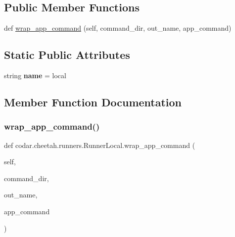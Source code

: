 \subsection*{Public Member Functions}
\begin{DoxyCompactItemize}
\item 
def \hyperlink{classcodar_1_1cheetah_1_1runners_1_1_runner_local_a188cd7fa3f8ebd97c936f2f00ee5b496}{wrap\+\_\+app\+\_\+command} (self, command\+\_\+dir, out\+\_\+name, app\+\_\+command)
\end{DoxyCompactItemize}
\subsection*{Static Public Attributes}
\begin{DoxyCompactItemize}
\item 
\mbox{\label{classcodar_1_1cheetah_1_1runners_1_1_runner_local_a0456010ad8c87331e23127a490227bf1}} 
string {\bfseries name} = \textquotesingle{}local\textquotesingle{}
\end{DoxyCompactItemize}


\subsection{Member Function Documentation}
\mbox{\label{classcodar_1_1cheetah_1_1runners_1_1_runner_local_a188cd7fa3f8ebd97c936f2f00ee5b496}} 
\subsubsection{\texorpdfstring{wrap\+\_\+app\+\_\+command()}{wrap\_app\_command()}}
{\footnotesize\ttfamily def codar.\+cheetah.\+runners.\+Runner\+Local.\+wrap\+\_\+app\+\_\+command (\begin{DoxyParamCaption}\item[{}]{self,  }\item[{}]{command\+\_\+dir,  }\item[{}]{out\+\_\+name,  }\item[{}]{app\+\_\+command }\end{DoxyParamCaption})}

